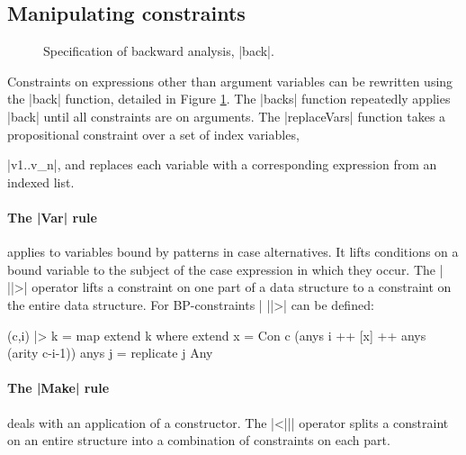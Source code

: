 \subsection{Manipulating constraints}
\label{sec:backward}

\begin{figure}
\caption{Specification of backward analysis, |back|.}
\label{fig:backward}
\end{figure}

Constraints on expressions other than argument variables can be rewritten using the |back| function, detailed in Figure \ref{fig:backward}. The |backs| function repeatedly applies |back| until all constraints are on arguments. The |replaceVars| function takes a propositional constraint over a set of index variables, \ignore|v1..v_n|, and replaces each variable with a corresponding expression from an indexed list.

\paragraph{The |Var| rule} applies to variables bound by patterns in case alternatives. It lifts conditions on a bound variable to the subject of the case expression in which they occur. The | ||>| operator lifts a constraint on one part of a data structure to a constraint on the entire data structure. For BP-constraints | ||>| can be defined:

\begin{code}
(c,i) |> k = map extend k
    where
    extend x = Con c (anys i ++ [x] ++ anys (arity c-i-1))
    anys j = replicate j Any
\end{code}

\paragraph{The |Make| rule} deals with an application of a constructor. The |<||| operator splits a constraint on an entire structure into a combination of constraints on each part.

